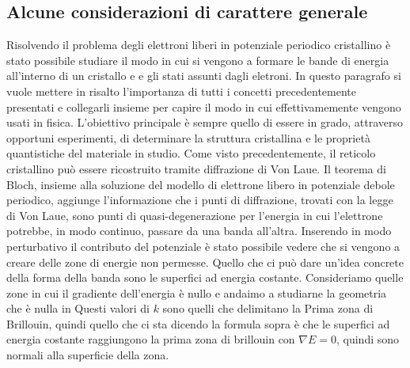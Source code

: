 \documentclass[a4paper,12pt]{article}
\begin{document}
\subsection{Alcune considerazioni di carattere generale}
Risolvendo il problema degli elettroni liberi in potenziale periodico cristallino è stato possibile studiare il modo in cui si vengono a formare le bande di energia all'interno di un cristallo e e gli stati assunti dagli eletroni. In questo paragrafo si vuole mettere in risalto l'importanza di tutti i concetti precedentemente presentati e collegarli insieme per capire il modo in cui effettivamemente vengono usati in fisica. L'obiettivo principale è sempre quello di essere in grado, attraverso opportuni esperimenti, di determinare la struttura cristallina e le proprietà quantistiche del materiale in studio. Come visto precedentemente, il reticolo cristallino può essere ricostruito tramite diffrazione di Von Laue. Il teorema di Bloch, insieme alla soluzione del modello di elettrone libero in potenziale debole periodico, aggiunge l'informazione che i punti di diffrazione, trovati con la legge di Von Laue, sono punti di quasi-degenerazione per l'energia in cui l'elettrone potrebbe, in modo continuo, passare da una banda all'altra. Inserendo in modo perturbativo il contributo del potenziale è stato possibile vedere che si vengono a creare delle zone di energie non permesse. Quello che ci può dare un'idea concrete della forma della banda sono le superfici ad energia costante. Consideriamo quelle zone in cui il gradiente dell'energia è nullo e andaimo a studiarne la geometria
che è nulla in 
Questi valori di $k$ sono quelli che delimitano la Prima zona di Brillouin, quindi quello che ci sta dicendo la formula sopra è che le superfici ad energia costante raggiungono la prima zona di brillouin con $\nabla E =0$, quindi sono normali alla superficie della zona.
\end{document}
